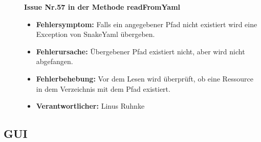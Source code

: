 \documentclass[parskip=full]{scrartcl}
\begin{document}
\begin{description}
\item []\textbf{Issue Nr.57 in der Methode readFromYaml} 

\begin{itemize}
\item []\textbf{Fehlersymptom:} Falls ein angegebener Pfad nicht existiert wird eine Exception von SnakeYaml übergeben.
\item []\textbf{Fehlerursache:} Übergebener Pfad existiert nicht, aber wird nicht abgefangen.
\item []\textbf{Fehlerbehebung:} Vor dem Lesen wird überprüft, ob eine Ressource in dem Verzeichnis mit dem Pfad existiert.
\item []\textbf{Verantwortlicher:} Linus Ruhnke
\end{itemize}

\end{description}


\clearpage
\subsection{GUI}
\end{document}
